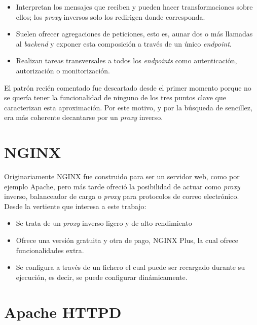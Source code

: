 \documentclass[11pt,spanish,listoffigures]{tfgetsinf}
\begin{document}
\begin{itemize}

\item Interpretan los mensajes que reciben y pueden hacer transformaciones sobre ellos; los \emph{proxy} inversos solo los redirigen donde corresponda.
\item Suelen ofrecer agregaciones de peticiones, esto es, aunar dos o más llamadas al \emph{backend} y exponer esta composición a través de un único \emph{endpoint}.
\item Realizan tareas transversales a todos los \emph{endpoints} como autenticación, autorización o monitorización.

\end{itemize}

El patrón recién comentado fue descartado desde el primer momento porque no se quería tener la funcionalidad de ninguno de los tres puntos clave que caracterizan esta aproximación. Por este motivo, y por la búsqueda de sencillez, era más coherente decantarse por un \emph{proxy} inverso.


\section{NGINX}
Originariamente NGINX \cite{NGINX} fue construido para ser un servidor web, como por ejemplo Apache, pero más tarde ofreció la posibilidad de actuar como \emph{proxy} inverso, balanceador de carga o \emph{proxy} para protocolos de correo electrónico. Desde la vertiente que interesa a este trabajo:

\begin{itemize}

\item Se trata de un \emph{proxy} inverso ligero y de alto rendimiento
\item Ofrece una versión gratuita y otra de pago, NGINX Plus, la cual ofrece funcionalidades extra.
\item Se configura a través de un fichero el cual puede ser recargado durante su ejecución, es decir, se puede configurar dinámicamente.

\end{itemize}


\section{Apache HTTPD}
\end{document}
